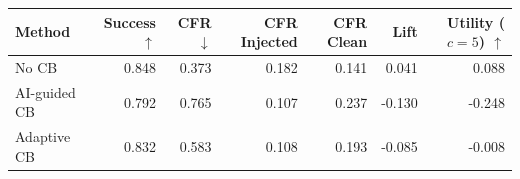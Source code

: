 \begin{tabular}{lrrrrrr}
\toprule
Method & Success $\uparrow$ & CFR $\downarrow$ & CFR Injected & CFR Clean & Lift & Utility ($c=5$) $\uparrow$ \\
\midrule
No CB & 0.848 & 0.373 & 0.182 & 0.141 & 0.041 & 0.088 \\
AI-guided CB & 0.792 & 0.765 & 0.107 & 0.237 & -0.130 & -0.248 \\
Adaptive CB & 0.832 & 0.583 & 0.108 & 0.193 & -0.085 & -0.008 \\
\bottomrule
\end{tabular}
